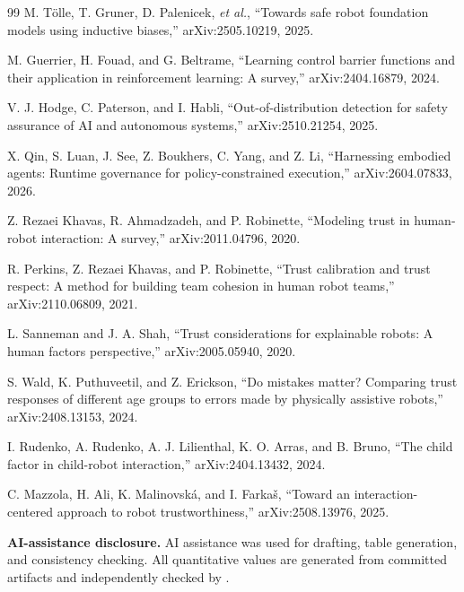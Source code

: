 \documentclass[conference]{IEEEtran}
\begin{document}
\begin{thebibliography}{99}
M. T{\"o}lle, T. Gruner, D. Palenicek, \emph{et al.}, ``Towards safe robot foundation models using inductive biases,'' arXiv:2505.10219, 2025.

M. Guerrier, H. Fouad, and G. Beltrame, ``Learning control barrier functions and their application in reinforcement learning: A survey,'' arXiv:2404.16879, 2024.

V. J. Hodge, C. Paterson, and I. Habli, ``Out-of-distribution detection for safety assurance of AI and autonomous systems,'' arXiv:2510.21254, 2025.

X. Qin, S. Luan, J. See, Z. Boukhers, C. Yang, and Z. Li, ``Harnessing embodied agents: Runtime governance for policy-constrained execution,'' arXiv:2604.07833, 2026.

Z. Rezaei Khavas, R. Ahmadzadeh, and P. Robinette, ``Modeling trust in human-robot interaction: A survey,'' arXiv:2011.04796, 2020.

R. Perkins, Z. Rezaei Khavas, and P. Robinette, ``Trust calibration and trust respect: A method for building team cohesion in human robot teams,'' arXiv:2110.06809, 2021.

L. Sanneman and J. A. Shah, ``Trust considerations for explainable robots: A human factors perspective,'' arXiv:2005.05940, 2020.

S. Wald, K. Puthuveetil, and Z. Erickson, ``Do mistakes matter? Comparing trust responses of different age groups to errors made by physically assistive robots,'' arXiv:2408.13153, 2024.

I. Rudenko, A. Rudenko, A. J. Lilienthal, K. O. Arras, and B. Bruno, ``The child factor in child-robot interaction,'' arXiv:2404.13432, 2024.

C. Mazzola, H. Ali, K. Malinovsk{\'a}, and I. Farka{\v{s}}, ``Toward an interaction-centered approach to robot trustworthiness,'' arXiv:2508.13976, 2025.

\end{thebibliography}

\par\smallskip
\noindent\textbf{AI-assistance disclosure.} AI assistance was used for drafting, table generation, and consistency checking. All quantitative values are generated from committed artifacts and independently checked by .
\end{document}
